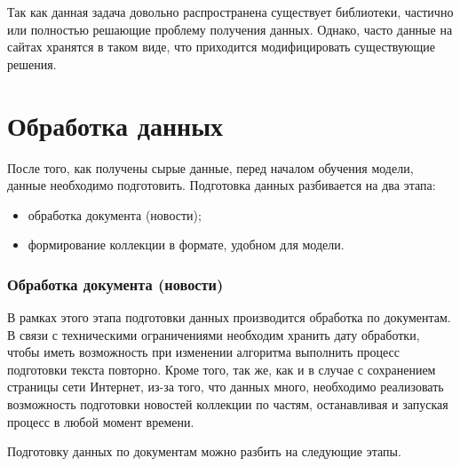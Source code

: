 Так как данная задача довольно распространена существует библиотеки, частично или полностью решающие проблему получения данных. Однако, часто данные на сайтах хранятся в таком виде, что приходится модифицировать существующие решения. 

%
\section{Обработка данных}

После того, как получены сырые данные, перед началом обучения модели, данные необходимо подготовить. Подготовка данных разбивается на два этапа:

\begin{itemize}
    \item обработка документа (новости);
    \item формирование коллекции в формате, удобном для модели.
\end{itemize}

%
\subsubsection{Обработка документа (новости)}

В рамках этого этапа подготовки данных производится обработка по документам. В связи с техническими ограничениями необходим хранить дату обработки, чтобы иметь возможность при изменении алгоритма выполнить процесс подготовки текста повторно. Кроме того, так же, как и в случае с сохранением страницы сети Интернет, из-за того, что данных много, необходимо реализовать возможность подготовки новостей коллекции по частям, останавливая и запуская процесс в любой момент времени.

Подготовку данных по документам можно разбить на следующие этапы.


